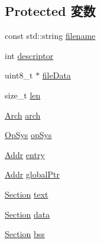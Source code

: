 \subsection*{Protected 変数}
\begin{DoxyCompactItemize}
\item 
const std::string \hyperlink{classObjectFile_a42a21beb8018ac623f4d09db1343b9cf}{filename}
\item 
int \hyperlink{classObjectFile_afbe0a70d4d8f0e3df77ec516d0926b23}{descriptor}
\item 
uint8\_\-t $\ast$ \hyperlink{classObjectFile_a3e95cf013fe7a42d87c9d64a0599776e}{fileData}
\item 
size\_\-t \hyperlink{classObjectFile_a7360b55975153b822efc5217b7734e6a}{len}
\item 
\hyperlink{classObjectFile_a0ac03ab06a859320a9072002bdf3aa0f}{Arch} \hyperlink{classObjectFile_aa13a20446350f8c7d3785f38d998883e}{arch}
\item 
\hyperlink{classObjectFile_aafc438343baf22e5884dde40c41331e8}{OpSys} \hyperlink{classObjectFile_a59ee96d686807b0019e538b4cdad36cf}{opSys}
\item 
\hyperlink{base_2types_8hh_af1bb03d6a4ee096394a6749f0a169232}{Addr} \hyperlink{classObjectFile_a562dc1f7463f5ab88239b002d538b4db}{entry}
\item 
\hyperlink{base_2types_8hh_af1bb03d6a4ee096394a6749f0a169232}{Addr} \hyperlink{classObjectFile_a4304297b6427c5c8928dc762d0ebf95a}{globalPtr}
\item 
\hyperlink{structObjectFile_1_1Section}{Section} \hyperlink{classObjectFile_afa43ec010e59dc9f2d3f6a76dde82e25}{text}
\item 
\hyperlink{structObjectFile_1_1Section}{Section} \hyperlink{classObjectFile_abbae3bd152e2d64768026e03593e64f3}{data}
\item 
\hyperlink{structObjectFile_1_1Section}{Section} \hyperlink{classObjectFile_a9f3ce9bbede1311cacc26e2f59356c50}{bss}
\end{DoxyCompactItemize}


